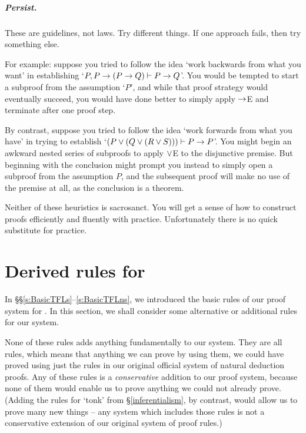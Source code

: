 \paragraph{Persist.}
These are guidelines, not laws. Try different things. If one approach fails, then try something else. 

For example: suppose you tried to follow the idea `work backwards from what you want' in establishing `$P, P \rightarrow (P \rightarrow Q) \vdash P \rightarrow Q$'. You would be tempted to start a subproof from the assumption `$P$', and while that proof strategy would eventually succeed, you would have done better to simply apply $\rightarrow$E and terminate after one proof step.

By contrast, suppose you tried to follow the idea `work forwards from what you have' in trying to establish `$(P \vee (Q \vee (R \vee S))) \vdash P \rightarrow P$'. You might begin an awkward nested series of subproofs to apply $\vee$E to the disjunctive premise. But beginning with the conclusion might prompt you instead to simply open a subproof from the assumption $P$, and the subsequent proof will make no use of the premise at all, as the conclusion is a theorem.

Neither of these heuristics is sacrosanct. You will get a sense of how to construct proofs efficiently and fluently with practice. Unfortunately there is no quick substitute for practice.








\chapter{Derived rules for \textnormal{\TFL}}\label{s:Derived}
In §§\ref{s:BasicTFLs}–\ref{s:BasicTFLns}, we introduced the basic rules of our proof system for \TFL. In this section, we shall consider some alternative or additional rules for our system.

None of these rules adds anything fundamentally to our system. They are all  rules, which means that anything we can prove by using them, we could have proved using just the rules in our original official system of natural deduction proofs. Any of these rules is a \emph{conservative} addition to our proof system, because none of them would enable us to prove anything we could not already prove. (Adding the rules for `tonk' from §\ref{inferentialism}, by contrast, would allow us to prove many new things – any system which includes those rules is not a conservative extension of our original system of proof rules.)

